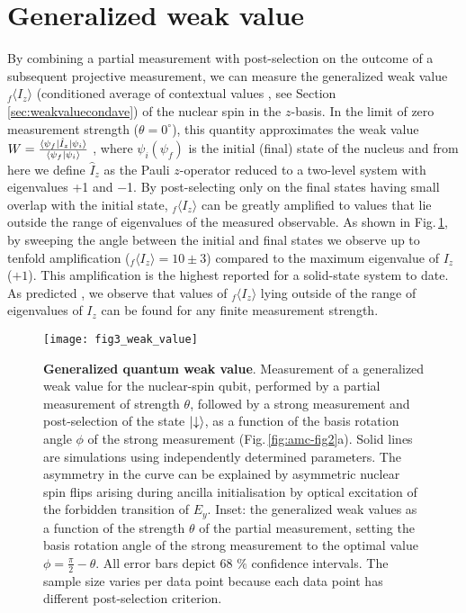 \section{Generalized weak value}
By combining a partial measurement with post-selection on the outcome of a subsequent projective measurement, we can measure the generalized weak value $_{f} \langle I_{z} \rangle$ (conditioned average of contextual values \cite{Dressel_PRL_2010}, see Section \ref{sec:weakvaluecondave}) of the nuclear spin in the $z$-basis. In the limit of zero measurement strength ($\theta = 0^{\circ}$), this quantity approximates the weak value \cite{Aharonov_PRL_1988} $W = \frac{\left<\psi_f\right| \hat{I}_z \left|\psi_i\right>}{\left<\psi_f\right| \psi_i \rangle}$ , where $ \psi_i (\psi_f )$ is the initial (final) state of the nucleus and from here we define $\hat{I}_z$ as the Pauli $z$-operator reduced to a two-level system with eigenvalues +1 and $-$1. By post-selecting only on the final states having small overlap with the initial state, $_{f} \langle I_{z} \rangle$ can be greatly amplified to values that lie outside the range of eigenvalues of the measured observable. As shown in Fig.\,\ref{fig:amc-fig3}, by sweeping the angle between the initial and final states we observe up to tenfold amplification ($_{f} \langle I_{z} \rangle = 10 \pm 3$) compared to the maximum eigenvalue of $I_{z}$ ($+1$). This amplification is the highest reported for a solid-state system to date\cite{Groen_PRL_2013}. As predicted \cite{Williams_PRL_2008}, we observe that values of  $_{f} \langle I_{z} \rangle$ lying outside of the range of eigenvalues of $I_{z}$ can be found for any finite measurement strength.

\begin{figure}
	\centering
	\texttt{[image: fig3\_weak\_value]}
	\caption{\label{fig:amc-fig3} \textbf{Generalized quantum weak value}. Measurement of a generalized weak value for the nuclear-spin qubit, performed by a partial measurement of strength $\theta$, followed by a strong measurement and post-selection of the state  $\left|\downarrow\right>$, as a function of the basis rotation angle $\phi$ of the strong measurement (Fig.\,\ref{fig:amc-fig2}a). Solid lines are simulations using independently determined parameters. The asymmetry in the curve can be explained by asymmetric nuclear spin flips arising during ancilla initialisation by optical excitation of the forbidden transition of $E_{y}$. Inset: the generalized weak values as a function of the strength $\theta$ of the partial measurement, setting the basis rotation angle of the strong measurement to the optimal value  $\phi = \frac{\pi}{2} - \theta$. All error bars depict 68 $\%$ confidence intervals. The sample size varies per data point because each data point has different post-selection criterion.}
\end{figure}

